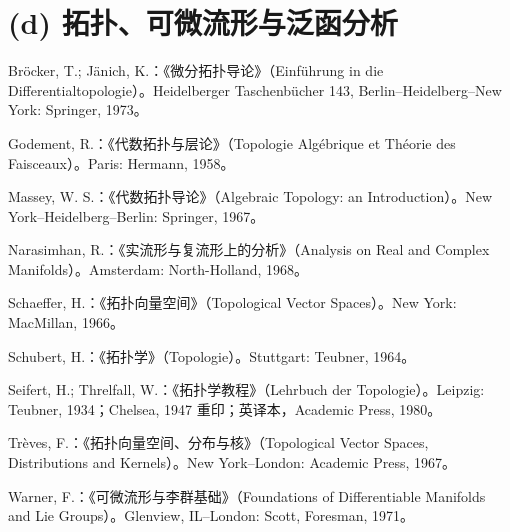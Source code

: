 \section*{(d) 拓扑、可微流形与泛函分析}
\begin{description}[style=nextline,leftmargin=2em]
\item[{[40]}] Bröcker, T.; Jänich, K.：《微分拓扑导论》（Einführung in die Differentialtopologie）。Heidelberger Taschenbücher 143, Berlin--Heidelberg--New York: Springer, 1973。
\item[{[41]}] Godement, R.：《代数拓扑与层论》（Topologie Algébrique et Théorie des Faisceaux）。Paris: Hermann, 1958。
\item[{[42]}] Massey, W. S.：《代数拓扑导论》（Algebraic Topology: an Introduction）。New York--Heidelberg--Berlin: Springer, 1967。
\item[{[43]}] Narasimhan, R.：《实流形与复流形上的分析》（Analysis on Real and Complex Manifolds）。Amsterdam: North-Holland, 1968。
\item[{[44]}] Schaeffer, H.：《拓扑向量空间》（Topological Vector Spaces）。New York: MacMillan, 1966。
\item[{[45]}] Schubert, H.：《拓扑学》（Topologie）。Stuttgart: Teubner, 1964。
\item[{[46]}] Seifert, H.; Threlfall, W.：《拓扑学教程》（Lehrbuch der Topologie）。Leipzig: Teubner, 1934；Chelsea, 1947 重印；英译本，Academic Press, 1980。
\item[{[47]}] Trèves, F.：《拓扑向量空间、分布与核》（Topological Vector Spaces, Distributions and Kernels）。New York--London: Academic Press, 1967。
\item[{[48]}] Warner, F.：《可微流形与李群基础》（Foundations of Differentiable Manifolds and Lie Groups）。Glenview, IL--London: Scott, Foresman, 1971。
\end{description}
